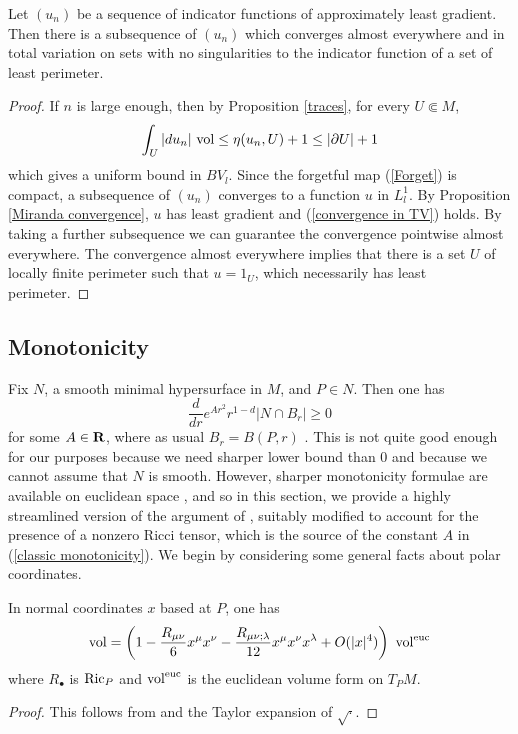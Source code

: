 \begin{corollary}\label{compactness}
Let $(u_n)$ be a sequence of indicator functions of approximately least gradient.
Then there is a subsequence of $(u_n)$ which converges almost everywhere and in total variation on sets with no singularities to the indicator function of a set of least perimeter.
\end{corollary}
\begin{proof}
If $n$ is large enough, then by Proposition \ref{traces}, for every $U \Subset M$,
$$\int_U |du_n| ~\mathrm{vol} \leq \eta(u_n, U) + 1 \leq |\partial U| + 1$$
which gives a uniform bound in $BV_l$.
Since the forgetful map (\ref{Forget}) is compact, a subsequence of $(u_n)$ converges to a function $u$ in $L^1_l$.
By Proposition \ref{Miranda convergence}, $u$ has least gradient and (\ref{convergence in TV}) holds.
By taking a further subsequence we can guarantee the convergence pointwise almost everywhere.
The convergence almost everywhere implies that there is a set $U$ of locally finite perimeter such that $u = 1_U$, which necessarily has least perimeter.
\end{proof}


\subsection{Monotonicity}\label{inequalities}
Fix $N$, a smooth minimal hypersurface in $M$, and $P \in N$. Then one has
\begin{equation}\label{classic monotonicity}
\frac{d}{dr} e^{Ar^2}r^{1 - d} |N \cap B_r| \geq 0
\end{equation}
for some $A \in \mathbf{R}$, where as usual $B_r = B(P, r)$ \cite[\S7]{MarquesXX}.
This is not quite good enough for our purposes because we need sharper lower bound than $0$ and because we cannot assume that $N$ is smooth.
However, sharper monotonicity formulae are available on euclidean space \cite[Proposition 5.12]{Giusti77}, and so in this section, we provide a highly streamlined version of the argument of \cite[Chapter 5]{Giusti77}, suitably modified to account for the presence of a nonzero Ricci tensor, which is the source of the constant $A$ in (\ref{classic monotonicity}).
We begin by considering some general facts about polar coordinates.

\begin{lemma}\label{taylor metric det}
In normal coordinates $x$ based at $P$, one has
$$\mathrm{vol} = \left(1 - \frac{R_{\mu\nu}}{6} x^\mu x^\nu - \frac{R_{\mu\nu;\lambda}}{12} x^\mu x^\nu x^\lambda + O(|x|^4)\right) ~\mathrm{vol}^{\mathrm{euc}}$$
where $R_\bullet$ is $\mathrm{Ric}_P$ and $\mathrm{vol}^{\mathrm{euc}}$ is the euclidean volume form on $T_PM$.
\end{lemma}
\begin{proof}
This follows from \cite[Lemma 3.4]{schoen1994lectures} and the Taylor expansion of $\sqrt \cdot$.
\end{proof}

